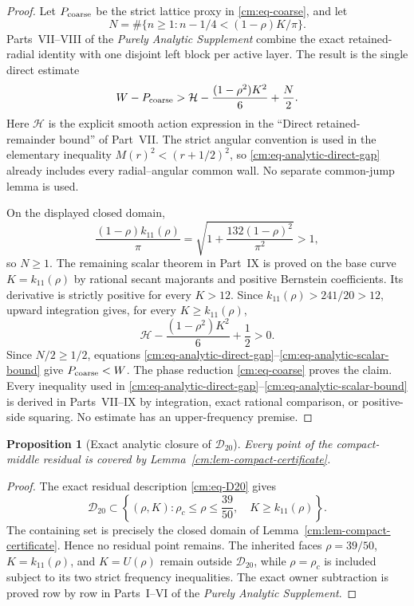 \documentclass[11pt]{article}
\numberwithin{equation}{section}
\newtheorem{proposition}[theorem]{Proposition}
\theoremstyle{definition}
\theoremstyle{remark}
\begin{document}
\begin{proof}
Let \(P_{\rm coarse}\) be the strict lattice proxy in
\eqref{cm:eq-coarse}, and let
\[
 N=\#\{n\geq1:n-1/4<(1-\rho)K/\pi\}.
\]
Parts~VII--VIII of the \emph{Purely Analytic Supplement} combine the exact
retained-radial identity with one disjoint left block per active layer.  The
result is the single direct estimate
\begin{equation}
 W-P_{\rm coarse}
 >\mathcal H-\frac{(1-\rho^2)K^2}{6}+\frac N2.
 \label{cm:eq-analytic-direct-gap}
\end{equation}
Here \(\mathcal H\) is the explicit smooth action expression in the
``Direct retained-remainder bound'' of Part~VII.
The strict angular convention is used in the elementary inequality
\(M(r)^2<(r+1/2)^2\), so \eqref{cm:eq-analytic-direct-gap} already includes
every radial--angular common wall.  No separate common-jump lemma is used.

On the displayed closed domain,
\[
 \frac{(1-\rho)k_{11}(\rho)}{\pi}
 =\sqrt{1+\frac{132(1-\rho)^2}{\pi^2}}>1,
\]
so \(N\geq1\).
The remaining scalar theorem in Part~IX is proved on the base curve
\(K=k_{11}(\rho)\) by rational secant majorants and positive Bernstein
coefficients.  Its derivative is strictly positive for every \(K>12\).
Since \(k_{11}(\rho)>241/20>12\), upward integration gives, for every
\(K\geq k_{11}(\rho)\),
\begin{equation}
 \mathcal H-\frac{(1-\rho^2)K^2}{6}+\frac12>0.
 \label{cm:eq-analytic-scalar-bound}
\end{equation}
Since \(N/2\geq1/2\), equations
\eqref{cm:eq-analytic-direct-gap}--\eqref{cm:eq-analytic-scalar-bound} give
\(P_{\rm coarse}<W\).  The phase reduction
\eqref{cm:eq-coarse} proves the claim.  Every inequality used in
\eqref{cm:eq-analytic-direct-gap}--\eqref{cm:eq-analytic-scalar-bound}
is derived in Parts~VII--IX by integration, exact rational comparison,
or positive-side squaring.  No estimate has an upper-frequency premise.
\end{proof}


\begin{proposition}[Exact analytic closure of \(\mathcal D_{20}\)]
\label{cm:prop-exact-closure}
Every point of the compact-middle residual is covered by
Lemma~\ref{cm:lem-compact-certificate}.
\end{proposition}

\begin{proof}
The exact residual description \eqref{cm:eq-D20} gives
\[
 \mathcal D_{20}
 \subset
 \left\{(\rho,K):
 \rho_c\leq\rho\leq\frac{39}{50},\quad
 K\geq k_{11}(\rho)\right\}.
\]
The containing set is precisely the closed domain of
Lemma~\ref{cm:lem-compact-certificate}.  Hence no residual point remains.
The inherited faces \(\rho=39/50\), \(K=k_{11}(\rho)\), and
\(K=U(\rho)\) remain outside \(\mathcal D_{20}\), while
\(\rho=\rho_c\) is included subject to its two strict frequency
inequalities.  The exact owner subtraction is proved row by row in
Parts~I--VI of the \emph{Purely Analytic Supplement}.
\end{proof}
\end{document}
